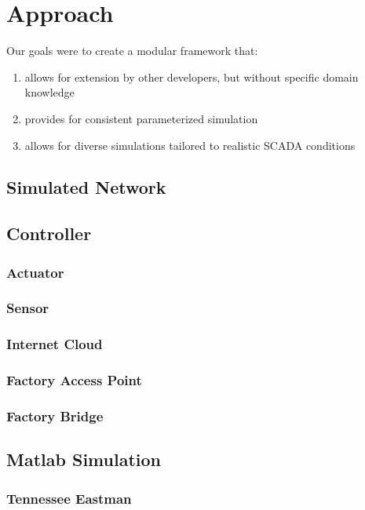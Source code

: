 \section{Approach}
Our goals were to create a modular framework that:
\begin{enumerate}
\item allows for extension by other developers, but without specific domain knowledge
\item provides for consistent parameterized simulation
\item allows for diverse simulations tailored to realistic SCADA conditions
\end{enumerate}
\subsection{Simulated Network}

\subsection{Controller}

\subsubsection{Actuator}

\subsubsection{Sensor}

\subsubsection{Internet Cloud}

\subsubsection{Factory Access Point}

\subsubsection{Factory Bridge}

\subsection{Matlab Simulation}

\subsubsection{Tennessee Eastman}

